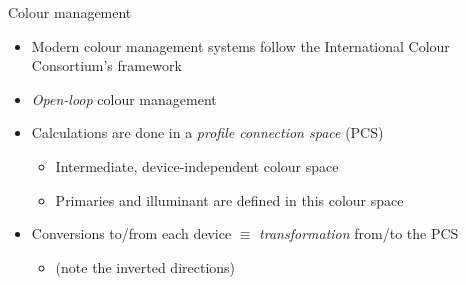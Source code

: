 \documentclass[aspectratio=169,handout]{fireshonks}
\begin{document}
\begin{frame}{Colour management}
    \begin{itemize}
        \item Modern colour management systems follow the International Colour Consortium's framework \autocite{allen}
        \item \emph{Open-loop} colour management
        \item Calculations are done in a \emph{profile connection space} (PCS)
        \begin{itemize}
            \item Intermediate, device-independent colour space
            \item Primaries and illuminant are defined in this colour space
        \end{itemize}
        \item Conversions to/from each device $\equiv$ \emph{transformation} from/to the PCS
              \begin{itemize}
                  \item (note the inverted directions)
              \end{itemize}
    \end{itemize}
\end{frame}
\end{document}
